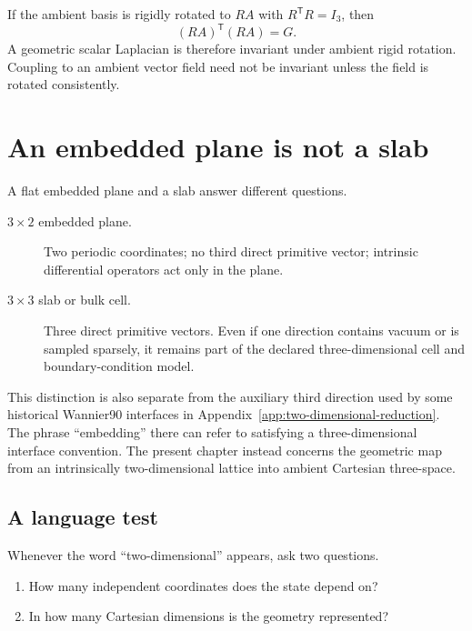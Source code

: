 If the ambient basis is rigidly rotated to $RA$ with
$R^{\mathsf T}R=I_3$, then
\begin{equation}
  (RA)^{\mathsf T}(RA)=G.
  \label{eq:training-rotation-invariance}
\end{equation}
A geometric scalar Laplacian is therefore invariant under ambient rigid
rotation. Coupling to an ambient vector field need not be invariant unless the
field is rotated consistently.

\section{An embedded plane is not a slab}

A flat embedded plane and a slab answer different questions.

\begin{description}
  \item[$3\times2$ embedded plane.] Two periodic coordinates; no third direct
    primitive vector; intrinsic differential operators act only in the plane.
  \item[$3\times3$ slab or bulk cell.] Three direct primitive vectors. Even if
    one direction contains vacuum or is sampled sparsely, it remains part of
    the declared three-dimensional cell and boundary-condition model.
\end{description}

This distinction is also separate from the auxiliary third direction used by
some historical Wannier90 interfaces in
Appendix~\ref{app:two-dimensional-reduction}. The phrase ``embedding'' there
can refer to satisfying a three-dimensional interface convention. The present
chapter instead concerns the geometric map from an intrinsically
two-dimensional lattice into ambient Cartesian three-space.

\subsection{A language test}

Whenever the word ``two-dimensional'' appears, ask two questions.

\begin{enumerate}
  \item How many independent coordinates does the state depend on?
  \item In how many Cartesian dimensions is the geometry represented?
\end{enumerate}

